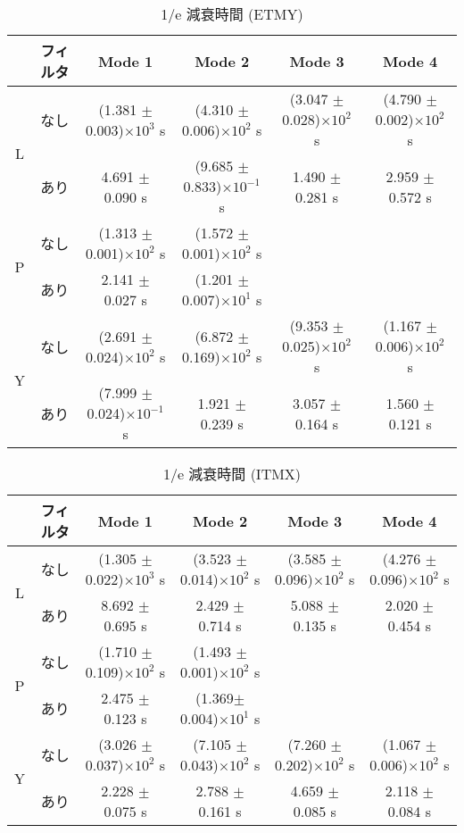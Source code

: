 \begin{table}[H]
 \centering
  \begin{tabular}{|c||c|c|c|c|c|}
   \hline
    & フィルタ & Mode 1 & Mode 2 & Mode 3 & Mode 4 \\
   \hline
   \multirow{2}{*}{L} & なし &(1.381 $\pm$ 0.003)$\times10^3$ s & (4.310 $\pm$ 0.006)$\times10^2$ s & (3.047 $\pm$ 0.028)$\times10^2$ s & (4.790 $\pm$ 0.002)$\times10^2$ s \\
   \cline{2-6}
      & あり &4.691 $\pm$ 0.090 s & (9.685 $\pm$ 0.833)$\times10^{-1}$ s & 1.490 $\pm$ 0.281 s & 2.959 $\pm$ 0.572 s \\
   \hline\hline
   \multirow{2}{*}{P} & なし &(1.313 $\pm$ 0.001)$\times10^2$ s & (1.572 $\pm$ 0.001)$\times10^2$ s & &\\
   \cline{2-6}
     & あり &2.141 $\pm$ 0.027 s & (1.201 $\pm$ 0.007)$\times10^{1}$ s & & \\
   \hline\hline
   \multirow{2}{*}{Y} & なし &(2.691 $\pm$ 0.024)$\times10^2$ s & (6.872 $\pm$ 0.169)$\times10^2$ s & (9.353 $\pm$ 0.025)$\times10^2$ s & (1.167 $\pm$ 0.006)$\times10^2$ s \\
   \cline{2-6}
      & あり &(7.999 $\pm$ 0.024)$\times10^{-1}$ s & 1.921 $\pm$ 0.239 s & 3.057 $\pm$ 0.164 s & 1.560 $\pm$ 0.121 s \\
   \hline
  \end{tabular}
   \caption[1/e 減衰時間 (ETMY)]{1/e 減衰時間 (ETMY)}
    \label{table6.6}
\end{table}
\begin{table}[H]
 \centering
  \begin{tabular}{|c||c|c|c|c|c|}
   \hline
    & フィルタ & Mode 1 & Mode 2 & Mode 3 & Mode 4 \\
   \hline
   \multirow{2}{*}{L} & なし &(1.305 $\pm$ 0.022)$\times10^3$ s & (3.523 $\pm$ 0.014)$\times10^2$ s & (3.585 $\pm$ 0.096)$\times10^2$ s & (4.276 $\pm$ 0.096)$\times10^2$ s \\
   \cline{2-6}
      & あり &8.692 $\pm$ 0.695 s & 2.429 $\pm$ 0.714 s & 5.088 $\pm$ 0.135 s & 2.020 $\pm$ 0.454 s \\
   \hline\hline
   \multirow{2}{*}{P} & なし &(1.710 $\pm$ 0.109)$\times10^2$ s & (1.493 $\pm$ 0.001)$\times10^2$ s & &  \\
   \cline{2-6}
     & あり & 2.475 $\pm$ 0.123 s & (1.369$\pm$0.004)$\times10^1$ s & &  \\
   \hline\hline
   \multirow{2}{*}{Y} & なし &(3.026 $\pm$ 0.037)$\times10^2$ s & (7.105 $\pm$ 0.043)$\times10^2$ s & (7.260 $\pm$ 0.202)$\times10^2$ s & (1.067 $\pm$ 0.006)$\times10^2$ s \\
   \cline{2-6}
      & あり &2.228 $\pm$ 0.075 s & 2.788 $\pm$ 0.161 s & 4.659 $\pm$ 0.085 s & 2.118 $\pm$ 0.084 s \\
   \hline
  \end{tabular}
  \caption[1/e 減衰時間 (ITMX)]{1/e 減衰時間 (ITMX)}
   \label{table6.7}
\end{table}
